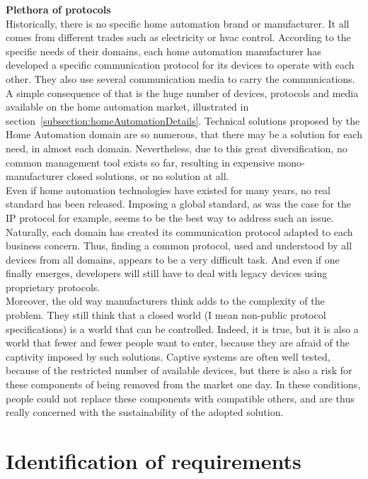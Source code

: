 {\bf Plethora of protocols}\\
Historically, there is no specific home automation brand or manufacturer. It all comes from different trades such as electricity or \gls{hvac} control. According to the specific needs of their domains, each home automation manufacturer has developed a specific communication protocol for its devices to operate with each other. They also use several communication media to carry the communications. A simple consequence of that is the huge number of devices, protocols and media available on the home automation market, illustrated in section~\ref{subsection:homeAutomationDetails}. 
Technical solutions proposed by the Home Automation domain are so numerous, that there may be a solution for each need, in almost each domain. Nevertheless, due to this great diversification, no common management tool exists so far, resulting in expensive mono-manufacturer closed solutions, or no solution at all.\\
Even if home automation technologies have existed for many years, no real standard has been released. Imposing a global standard, as was the case for the IP protocol for example, seems to be the best way to address such an issue. Naturally, each domain has created its communication protocol adapted to each business concern. Thus, finding a common protocol, used and understood by all devices from all domains, appears to be a very difficult task. And even if one finally emerges, developers will still have to deal with legacy devices using proprietary protocols.\\
Moreover, the old way manufacturers think adds to the complexity of the problem. They still think that a closed world (I mean non-public protocol specifications) is a world that can be controlled. Indeed, it is true, but it is also a world that fewer and fewer people want to enter, because they are afraid of the captivity imposed by such solutions. Captive systems are often well tested, because of the  restricted number of available devices, but there is also a risk for these components of being removed from the market one day. In these conditions, people could not replace these components with compatible others, and are thus really concerned with the sustainability of the adopted solution.\\



\section{Identification of requirements}
\label{ch:requirements}

